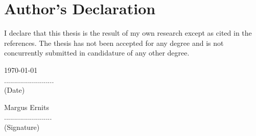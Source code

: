 \clearpage
\chapter*{Author’s Declaration}
\label{declaration}
\thispagestyle{empty}

I declare that this thesis is the result of my own research except as cited in the references. 
The thesis has not been accepted for any degree and is not concurrently submitted in candidature 
of any other degree.
\\
[2cm]

\begin{minipage}{0.5\textwidth}
	\begin{flushleft}
	\today \\
		......................... \\
		(Date) 
	\end{flushleft}
\end{minipage}
\begin{minipage}{0.5\textwidth}
	\begin{flushright}
	Margus Ernits \\
	........................ \\
	(Signature) 
	\end{flushright}
\end{minipage}
